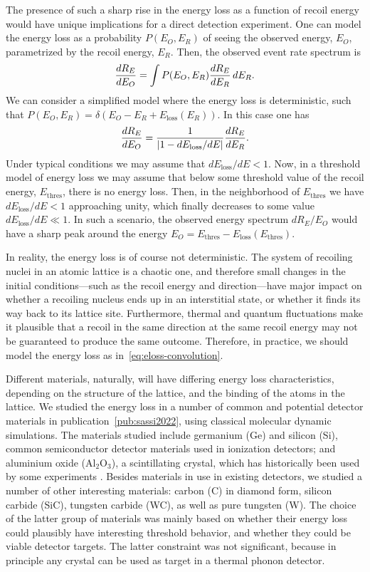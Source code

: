 The presence of such a sharp rise in the energy loss as a function of recoil energy would have unique implications for a direct detection experiment. One can model the energy loss as a probability $P(E_O,E_R)$ of seeing the observed energy, $E_O$, parametrized by the recoil energy, $E_R$. Then, the observed event rate spectrum is
\begin{equation}
    \frac{dR_E}{dE_O}=\int P(E_O,E_R)\frac{dR_E}{dE_R}\,d E_R.
    \label{eq:eloss-convolution}
\end{equation}
We can consider a simplified model where the energy loss is deterministic, such that $P(E_O,E_R)=\delta(E_O-E_R+E_\text{loss}(E_R))$. In this case one has
\begin{equation}
    \frac{dR_E}{dE_O}=\frac{1}{|1-dE_\text{loss}/dE|}\frac{dR_E}{dE_R}.
\end{equation}
Under typical conditions we may assume that $dE_\text{loss}/dE<1$. Now, in a threshold model of energy loss we may assume that below some threshold value of the recoil energy, $E_\text{thres}$, there is no energy loss. Then, in the neighborhood of $E_\text{thres}$ we have $dE_\text{loss}/dE<1$ approaching unity, which finally decreases to some value $dE_\text{loss}/dE\ll1$. In such a scenario, the observed energy spectrum $dR_E/E_O$ would have a sharp peak around the energy $E_O=E_\text{thres}-E_\text{loss}(E_\text{thres})$.

In reality, the energy loss is of course not deterministic. The system of recoiling nuclei in an atomic lattice is a chaotic one, and therefore small changes in the initial conditions---such as the recoil energy and direction---have major impact on whether a recoiling nucleus ends up in an interstitial state, or whether it finds its way back to its lattice site. Furthermore, thermal and quantum fluctuations make it plausible that a recoil in the same direction at the same recoil energy may not be guaranteed to produce the same outcome. Therefore, in practice, we should model the energy loss as in~\eqref{eq:eloss-convolution}.

Different materials, naturally, will have differing energy loss characteristics, depending on the structure of the lattice, and the binding of the atoms in the lattice. We studied the energy loss in a number of common and potential detector materials in publication~\ref{pub:sassi2022}, using classical molecular dynamic simulations. The materials studied include germanium (Ge) and silicon (Si), common semiconductor detector materials used in ionization detectors; and aluminium oxide (Al$_2$O$_3$), a scintillating crystal, which has historically been used by some experiments \parencites{deBellefonEtAl1996, CebrianEtAl2004, AngloherEtAl2017}. Besides materials in use in existing detectors, we studied a number of other interesting materials: carbon (C) in diamond form, silicon carbide (SiC), tungsten carbide (WC), as well as pure tungsten (W). The choice of the latter group of materials was mainly based on whether their energy loss could plausibly have interesting threshold behavior, and whether they could be viable detector targets. The latter constraint was not significant, because in principle any crystal can be used as target in a thermal phonon detector.

